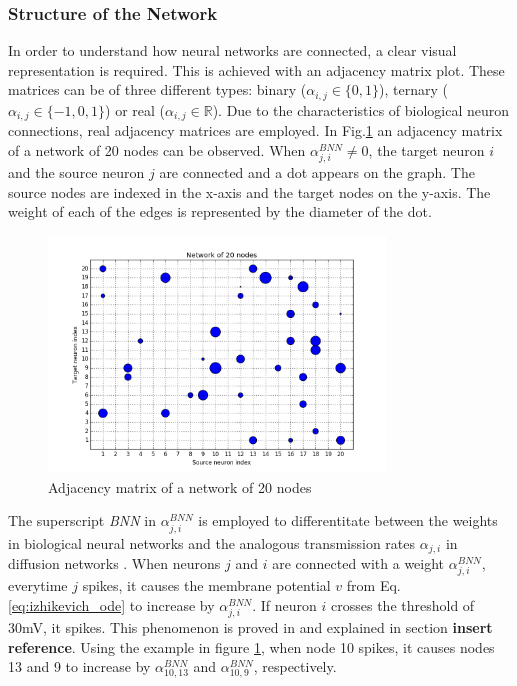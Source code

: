 \documentclass[11pt]{article}
\begin{document}
\subsubsection{Structure of the Network}

In order to understand how neural networks are connected, a clear visual representation is required. This is achieved with an adjacency matrix plot. These matrices can be of three different types: binary ($\alpha_{i,j}\in\{0,1\}$), ternary ($\alpha_{i,j}\in\{-1,0,1\}$) or real ($\alpha_{i,j}\in \mathbb{R}$). Due to the characteristics of biological neuron connections, real adjacency matrices are employed. In Fig.\ref{fig:graph_20_nodes} an adjacency matrix of a network of 20 nodes can be observed. When $\alpha_{j,i}^{BNN}\neq 0$, the target neuron $i$ and the source neuron $j$ are connected and a dot appears on the graph. The source nodes are indexed in the x-axis and the target nodes on the y-axis. The weight of each of the edges is represented by the diameter of the dot. 

\begin{figure}
  \centering
  \includegraphics[width=0.8\textwidth]{graph_20_nodes.png}
  \caption{Adjacency matrix of a network of 20 nodes}
	\label{fig:graph_20_nodes}
\end{figure}

The superscript \textit{BNN} in $\alpha_{j,i}^{BNN}$ is employed to differentitate between the weights in biological neural networks and the analogous transmission rates $\alpha_{j,i}$ in diffusion networks \cite{pranav_report}. When neurons $j$ and $i$ are connected with a weight $\alpha_{j,i}^{BNN}$, everytime $j$ spikes, it causes the membrane potential $v$ from Eq.\ref{eq:izhikevich_ode} to increase by $\alpha_{j,i}^{BNN}$. If neuron $i$ crosses the threshold of 30mV, it spikes. This phenomenon is proved in \cite{alexandru2018estimating} and explained in section \textbf{insert reference}. Using the example in figure \ref{fig:graph_20_nodes}, when node 10 spikes, it causes nodes 13 and 9 to increase by $\alpha_{10,13}^{BNN}$ and $\alpha_{10,9}^{BNN}$, respectively. 
\end{document}
